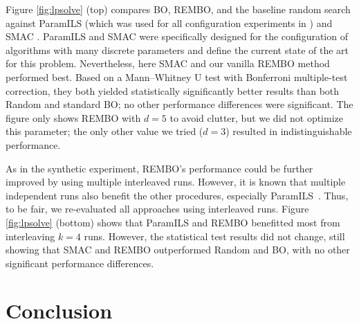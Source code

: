 \documentclass{article}
\newcommand{\note}[1]{}
\renewcommand{\note}[1]{~\\\frame{\begin{minipage}[c]{0.48\textwidth}\vspace{2pt}\center{#1}\vspace{2pt}\end{minipage}}\vspace{3pt}\\}
\begin{document}
%
%

Figure \ref{fig:lpsolve} (top) compares BO, REMBO, and the baseline random search against ParamILS (which was used for all configuration experiments in \cite{Hutter:2010})
and SMAC \cite{Hutter:2011}. 
ParamILS and SMAC were specifically designed for the configuration of algorithms with many discrete parameters and define the current state of the art for this problem. Nevertheless, here SMAC and our vanilla REMBO method performed best. Based on a Mann–Whitney U test with Bonferroni multiple-test correction, they both yielded statistically significantly better results than both Random and standard BO; no other performance differences were significant.
The figure only shows REMBO with $d=5$ to avoid clutter, but we did not optimize this parameter; the only other value we tried ($d=3$) resulted in indistinguishable performance. 

As in the synthetic experiment, REMBO's performance could be further improved by using multiple interleaved runs. 
However, it is known that multiple independent runs also benefit the other procedures, especially ParamILS~\cite{HutHooLey12-ParallelAC}. Thus, to be fair, we re-evaluated all approaches using interleaved runs. Figure \ref{fig:lpsolve} (bottom) shows that ParamILS and REMBO benefitted most from interleaving $k=4$ runs. However, the statistical test results did not change, still showing that SMAC and REMBO outperformed Random and BO, with no other significant performance differences.


\section{Conclusion} \label{sec:conclusion}
\end{document}
